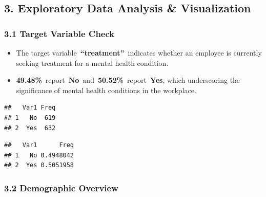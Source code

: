 \documentclass[
]{article}
\newenvironment{Shaded}{\begin{snugshade}}{\end{snugshade}}
\newcommand{\CommentTok}[1]{\textcolor[rgb]{0.56,0.35,0.01}{\textit{#1}}}
\newcommand{\FunctionTok}[1]{\textcolor[rgb]{0.13,0.29,0.53}{\textbf{#1}}}
\newcommand{\NormalTok}[1]{#1}
\newcommand{\SpecialCharTok}[1]{\textcolor[rgb]{0.81,0.36,0.00}{\textbf{#1}}}
\begin{document}
\subsection{\texorpdfstring{\textbf{3. Exploratory Data Analysis \&
Visualization}}{3. Exploratory Data Analysis \& Visualization}}\label{exploratory-data-analysis-visualization}

\subsubsection{3.1 Target Variable Check}\label{target-variable-check}

\begin{itemize}
\item
  The target variable~\textbf{``treatment''}~indicates whether an
  employee is currently seeking treatment for a mental health condition.
\item
  \textbf{49.48\%}~report~\textbf{No}~and~\textbf{50.52\%}~report~\textbf{Yes},
  which underscoring the significance of mental health conditions in the
  workplace.
\end{itemize}

\begin{Shaded}
\end{Shaded}

\begin{verbatim}
##   Var1 Freq
## 1   No  619
## 2  Yes  632
\end{verbatim}

\begin{Shaded}
\end{Shaded}

\begin{verbatim}
##   Var1      Freq
## 1   No 0.4948042
## 2  Yes 0.5051958
\end{verbatim}

\subsubsection{3.2 Demographic Overview}\label{demographic-overview}
\end{document}
